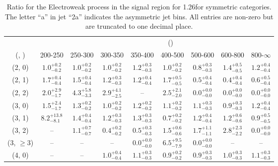 \begin{table}[h!]
\tiny
\centering
\caption{Ratio for the Electroweak process in the signal region for 1.26\ifb for symmetric categories. The letter ``a'' in jet \eg ``2a''  indicates the asymmetric jet bins. All entries are non-zero but are truncated to one decimal place.\label{tab:ratiosep_sig_ewk_sym}}
\begin{tabular}
{ccccccccc}
	\hline\hline
&	& \multicolumn{8}{c}{\scalht (\gev)} \\ 
	 (\njet,  \nb) & 200-250 & 250-300 & 300-350 & 350-400 & 400-500 & 500-600 & 600-800 & 800-$\infty$ \\ [0.8ex] 
\hline
	(2, 0) & $1.0^{+ 0.2 }_{- 0.2 }$ & $1.0^{+ 0.2 }_{- 0.2 }$ & $1.0^{+ 0.2 }_{- 0.2 }$ & $1.2^{+ 0.3 }_{- 0.3 }$ & $1.0^{+ 0.2 }_{- 0.2 }$ & $0.8^{+ 0.3 }_{- 0.3 }$ & $1.4^{+ 0.5 }_{- 0.5 }$ & $1.2^{+ 0.4 }_{- 0.4 }$ \\[0.5ex] 
	(2, 1) & $1.7^{+ 0.4 }_{- 0.4 }$ & $1.5^{+ 0.4 }_{- 0.4 }$ & $1.2^{+ 0.3 }_{- 0.3 }$ & $1.2^{+ 0.4 }_{- 0.4 }$ & $1.7^{+ 0.5 }_{- 0.5 }$ & $0.5^{+ 0.4 }_{- 0.4 }$ & $0.4^{+ 0.4 }_{- 0.4 }$ & $0.6^{+ 0.5 }_{- 0.4 }$ \\[0.5ex] 
	(2, 2) & $2.0^{+ 2.9 }_{- 1.7 }$ & $4.3^{+ 5.8 }_{- 3.3 }$ & $2.9^{+ 4.1 }_{- 2.5 }$ & -- & $2.5^{+ 2.1 }_{- 2.0 }$ & $0.0^{+ 0.0 }_{- 0.0 }$ & $0.0^{+ 0.0 }_{- 0.0 }$ & $0.0^{+ 0.0 }_{- 0.0 }$ \\[0.5ex] 
	(3, 0) & $1.5^{+ 2.4 }_{- 1.7 }$ & $1.3^{+ 0.2 }_{- 0.2 }$ & $1.0^{+ 0.2 }_{- 0.2 }$ & $1.2^{+ 0.2 }_{- 0.2 }$ & $1.1^{+ 0.2 }_{- 0.2 }$ & $1.1^{+ 0.3 }_{- 0.3 }$ & $0.9^{+ 0.3 }_{- 0.3 }$ & $1.2^{+ 0.4 }_{- 0.4 }$ \\[0.5ex] 
	(3, 1) & $8.2^{+ 13.8 }_{- 8.1 }$ & $1.4^{+ 0.4 }_{- 0.4 }$ & $1.2^{+ 0.3 }_{- 0.3 }$ & $1.3^{+ 0.3 }_{- 0.3 }$ & $0.7^{+ 0.2 }_{- 0.2 }$ & $1.2^{+ 0.4 }_{- 0.4 }$ & $1.2^{+ 0.6 }_{- 0.6 }$ & $0.9^{+ 0.5 }_{- 0.5 }$ \\[0.5ex] 
	(3, 2) & -- & $1.1^{+ 0.7 }_{- 0.7 }$ & $0.4^{+ 0.2 }_{- 0.2 }$ & $0.5^{+ 0.3 }_{- 0.3 }$ & $1.5^{+ 0.6 }_{- 0.6 }$ & $1.7^{+ 1.1 }_{- 1.1 }$ & $2.8^{+ 2.3 }_{- 2.2 }$ & $0.0^{+ 0.0 }_{- 0.0 }$ \\[0.5ex] 
	(3, $\ge3$) & -- & -- & -- & $0.0^{+ 0.0 }_{- 0.0 }$ & $6.5^{+ 9.5 }_{- 7.9 }$ & $0.0^{+ 0.0 }_{- 0.0 }$ & -- & -- \\[0.5ex] 
	(4, 0) & -- & -- & $1.0^{+ 0.4 }_{- 0.4 }$ & $1.1^{+ 0.3 }_{- 0.3 }$ & $0.9^{+ 0.2 }_{- 0.2 }$ & $0.9^{+ 0.3 }_{- 0.3 }$ & $1.0^{+ 0.3 }_{- 0.3 }$ & $1.1^{+ 0.3 }_{- 0.3 }$ \\[0.5ex] 

\end{tabular}
\end{table}
